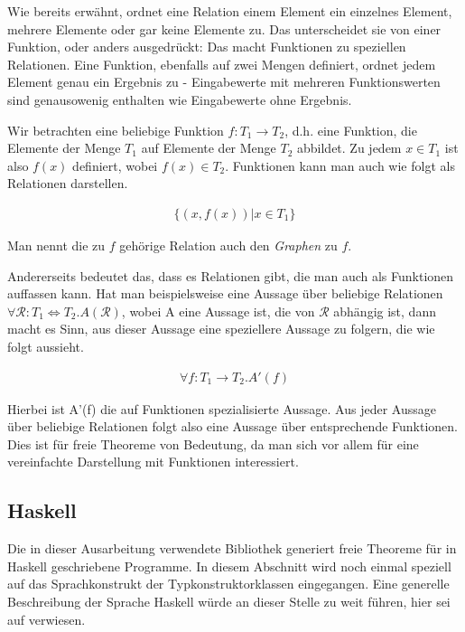 Wie bereits erwähnt, ordnet eine Relation einem Element ein einzelnes Element, mehrere Elemente oder gar keine Elemente zu.
Das unterscheidet sie von einer Funktion, oder anders ausgedrückt: Das macht Funktionen zu speziellen Relationen. Eine
Funktion, ebenfalls auf zwei Mengen definiert, ordnet jedem Element genau ein Ergebnis zu - Eingabewerte mit
mehreren Funktionswerten sind genausowenig enthalten wie Eingabewerte ohne Ergebnis.

Wir betrachten eine beliebige Funktion $f : T_1 \rightarrow T_2$, d.h. eine Funktion, die Elemente der Menge $T_1$ auf
Elemente der Menge $T_2$ abbildet. Zu jedem $x \in T_1$ ist also $f(x)$ definiert, wobei $f(x) \in T_2$. Funktionen kann
man auch wie folgt als Relationen darstellen.

\begin{align*}
\{ (x, f(x)) | x \in T_1 \}
\end{align*}

Man nennt die zu $f$ gehörige Relation auch den \textit{Graphen} zu $f$.

Andererseits bedeutet das, dass es Relationen gibt, die man auch als Funktionen auffassen kann. Hat man beispielsweise
eine Aussage über beliebige Relationen $\forall \mathcal{R} : T_1 \Leftrightarrow T_2 . A(\mathcal{R})$, wobei A eine
Aussage ist, die von $\mathcal{R}$ abhängig ist, dann macht es Sinn, aus dieser Aussage eine speziellere Aussage zu folgern,
die wie folgt aussieht.

\begin{align*}
\forall f : T_1 \rightarrow T_2 . A'(f)
\end{align*}

Hierbei ist A'(f) die auf Funktionen spezialisierte Aussage. Aus jeder Aussage über beliebige Relationen folgt also eine
Aussage über entsprechende Funktionen. Dies ist für freie Theoreme von Bedeutung, da man sich vor allem für eine vereinfachte
Darstellung mit Funktionen interessiert.


\subsection{Haskell}

Die in dieser Ausarbeitung verwendete Bibliothek generiert freie Theoreme für in Haskell geschriebene Programme. In diesem Abschnitt wird noch einmal speziell auf das Sprachkonstrukt der Typkonstruktorklassen eingegangen.
Eine generelle Beschreibung der Sprache Haskell würde an dieser Stelle zu weit führen, hier sei auf \cite{haskell} verwiesen.


